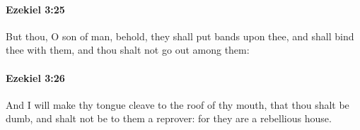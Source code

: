 		\paragraph{Ezekiel 3:25} %
			\label{EZEKIEL-3-25}

			But thou, O son of man, behold, they shall put bands upon thee, and shall bind thee with them, and thou shalt not go out among them:


		\paragraph{Ezekiel 3:26} %
			\label{EZEKIEL-3-26}

			And I will make thy tongue cleave to the roof of thy mouth, that thou shalt be dumb, and shalt not be to them a reprover: for they are a rebellious house.


